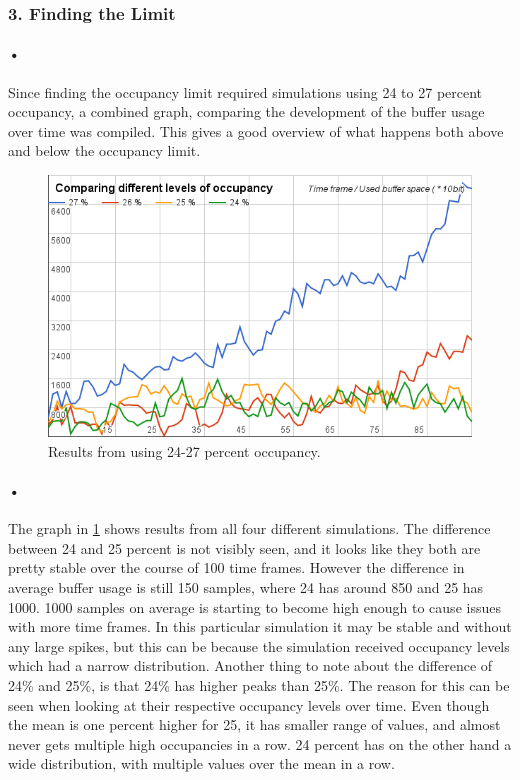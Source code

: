 \documentclass[a4paper, 12pt]{report}
\begin{document}
\subsubsection{3. Finding the Limit} %

\paragraph{•}
Since finding the occupancy limit required simulations using 24 to 27 percent occupancy, a combined graph, comparing the development of the buffer usage over time was compiled.
This gives a good overview of what happens both above and below the occupancy limit.

\begin{figure}[h!]
	\centering
		\includegraphics[width=1.0\textwidth]{images/24-27-occ.png}
		\caption{Results from using 24-27 percent occupancy.}
		\label{fig:24-27-occ}
\end{figure}

\paragraph{•}
The graph in \ref{fig:24-27-occ} shows results from all four different simulations.
The difference between 24 and 25 percent is not visibly seen, and it looks like they both are pretty stable over the course of 100 time frames.
However the difference in average buffer usage is still 150 samples, where 24 has around 850 and 25 has 1000.
1000 samples on average is starting to become high enough to cause issues with more time frames.
In this particular simulation it may be stable and without any large spikes, but this can be because the simulation received occupancy levels which had a narrow distribution.
Another thing to note about the difference of 24\% and 25\%, is that 24\% has higher peaks than 25\%.
The reason for this can be seen when looking at their respective occupancy levels over time.
Even though the mean is one percent higher for 25, it has smaller range of values, and almost never gets multiple high occupancies in a row.
24 percent has on the other hand a wide distribution, with multiple values over the mean in a row. 
\end{document}
